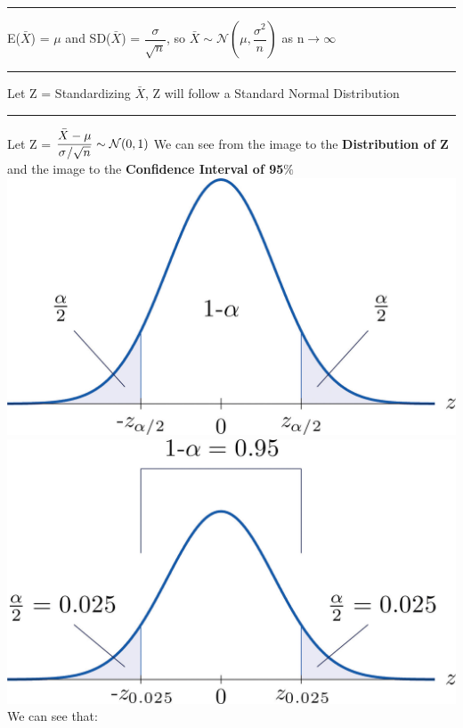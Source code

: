 \documentclass[]{article}
\begin{document}
\newline\Large\rule{1.3cm}{0pt} E($\bar{X}$) = $\mu$ and SD($\bar{X}$) = $\dfrac{\sigma}{\sqrt{n}}$, so $\bar{X} \sim \mathcal{N}(\mu, \dfrac{\sigma ^2}{ n })  $ as n$\to \infty$
\newline
\newline \Large\rule{1.3cm}{0pt} Let Z = Standardizing $\bar{X}$, Z will follow a Standard Normal Distribution
\newline 
\newline\Large\rule{1.3cm}{0pt} Let Z = $\dfrac{\bar{X} - \mu}{\sigma \\/ \sqrt{n} } \sim \mathcal{N}(0, 1) $
\newline 
\newline We can see from the image to the  \textbf{Distribution of Z} and the image to the  \textbf{Confidence Interval of 95$\%$}
\newline
\includegraphics[scale=0.7]{distribution_of_Z}
\includegraphics[scale=0.7]{ci_95}
\newline We can see that:
\newline 
\end{document}
